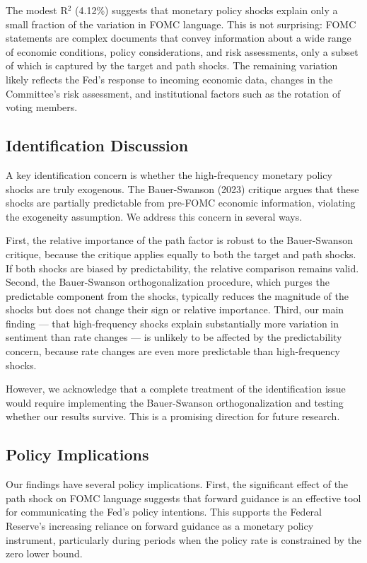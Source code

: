 \documentclass[12pt]{article}
\begin{document}
The modest R$^2$ (4.12\%) suggests that monetary policy shocks explain only a small fraction of the variation in FOMC language. This is not surprising: FOMC statements are complex documents that convey information about a wide range of economic conditions, policy considerations, and risk assessments, only a subset of which is captured by the target and path shocks. The remaining variation likely reflects the Fed's response to incoming economic data, changes in the Committee's risk assessment, and institutional factors such as the rotation of voting members.

\subsection{Identification Discussion}

A key identification concern is whether the high-frequency monetary policy shocks are truly exogenous. The Bauer-Swanson (2023) critique argues that these shocks are partially predictable from pre-FOMC economic information, violating the exogeneity assumption. We address this concern in several ways.

First, the relative importance of the path factor is robust to the Bauer-Swanson critique, because the critique applies equally to both the target and path shocks. If both shocks are biased by predictability, the relative comparison remains valid. Second, the Bauer-Swanson orthogonalization procedure, which purges the predictable component from the shocks, typically reduces the magnitude of the shocks but does not change their sign or relative importance. Third, our main finding --- that high-frequency shocks explain substantially more variation in sentiment than rate changes --- is unlikely to be affected by the predictability concern, because rate changes are even more predictable than high-frequency shocks.

However, we acknowledge that a complete treatment of the identification issue would require implementing the Bauer-Swanson orthogonalization and testing whether our results survive. This is a promising direction for future research.

\subsection{Policy Implications}

Our findings have several policy implications. First, the significant effect of the path shock on FOMC language suggests that forward guidance is an effective tool for communicating the Fed's policy intentions. This supports the Federal Reserve's increasing reliance on forward guidance as a monetary policy instrument, particularly during periods when the policy rate is constrained by the zero lower bound.
\end{document}
